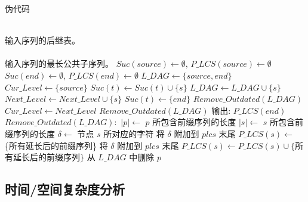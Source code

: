\begin{algorithm}
  \caption{伪代码}
  \footnotesize
  \label{alg:PMA}
  \begin{algorithmic}[1]
    \REQUIRE ~~\\
    输入序列的后继表。\\
    \ENSURE ~~\\
    输入序列的最长公共子序列。
    \STATE
    \STATE $Suc(source) \leftarrow \emptyset$, $P\_LCS(source) \leftarrow \emptyset$
    \STATE $Suc(end) \leftarrow \emptyset$, $P\_LCS(end) \leftarrow \emptyset$
    \STATE $L\_DAG \leftarrow \{source, end\}$
    \STATE $Cur\_Level \leftarrow \{source\}$
    \STATE
    \STATE $Suc(t) \leftarrow Suc(t) \cup \{s\}$
    \STATE $L\_DAG \leftarrow L\_DAG \cup \{s\}$
    \STATE $Next\_Level \leftarrow Next\_Level \cup \{s\}$
    \ENDIF
    \ENDFOR
    \STATE $Suc(t) \leftarrow \{end\}$
    \ENDIF
    \ENDFOR
    \STATE $Remove\_Outdated(L\_DAG)$
    \STATE $Cur\_Level \leftarrow Next\_Level$
    \ENDWHILE
    \STATE
    \STATE $Remove\_Outdated(L\_DAG)$
    \ENDWHILE
    \STATE
    \STATE 输出: $P\_LCS(end)$
    \STATE
    \STATE $Remove\_Outdated(L\_DAG):$
    \STATE $|p| \leftarrow $ $p$ 所包含前缀序列的长度
    \STATE $|s| \leftarrow $ $s$ 所包含前缀序列的长度
    \STATE $\delta \leftarrow $ 节点 $s$ 所对应的字符
    \STATE 将 $\delta$ 附加到 $plcs$ 末尾
    \ENDFOR
    \STATE $P\_LCS(s) \leftarrow $ \{所有延长后的前缀序列\} 
    \STATE 将 $\delta$ 附加到 $plcs$ 末尾
    \ENDFOR
    \STATE $P\_LCS(s) \leftarrow P\_LCS(s) \cup \{$所有延长后的前缀序列$\}$
    \ENDIF
    \STATE 从 $L\_DAG$ 中删除 $p$
    \ENDFOR
    \ENDFOR
  \end{algorithmic}
\end{algorithm}

\subsection{时间/空间复杂度分析}
\label{sec:complexity}

